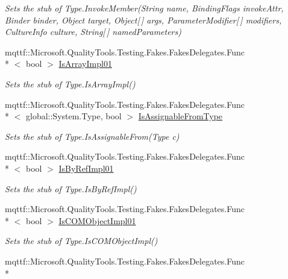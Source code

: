 \begin{DoxyCompactItemize}
\begin{DoxyCompactList}\small\item\em Sets the stub of Type.\-Invoke\-Member(\-String name, Binding\-Flags invoke\-Attr, Binder binder, Object target, Object\mbox{[}$\,$\mbox{]} args, Parameter\-Modifier\mbox{[}$\,$\mbox{]} modifiers, Culture\-Info culture, String\mbox{[}$\,$\mbox{]} named\-Parameters)\end{DoxyCompactList}\item 
mqttf\-::\-Microsoft.\-Quality\-Tools.\-Testing.\-Fakes.\-Fakes\-Delegates.\-Func\\*
$<$ bool $>$ \hyperlink{class_system_1_1_fakes_1_1_stub_type_a0018fb8f6dc2ce66e686666c4e4315d7}{Is\-Array\-Impl01}
\begin{DoxyCompactList}\small\item\em Sets the stub of Type.\-Is\-Array\-Impl()\end{DoxyCompactList}\item 
mqttf\-::\-Microsoft.\-Quality\-Tools.\-Testing.\-Fakes.\-Fakes\-Delegates.\-Func\\*
$<$ global\-::\-System.\-Type, bool $>$ \hyperlink{class_system_1_1_fakes_1_1_stub_type_a2a638755c07b386d7096d6d4c37f063c}{Is\-Assignable\-From\-Type}
\begin{DoxyCompactList}\small\item\em Sets the stub of Type.\-Is\-Assignable\-From(\-Type c)\end{DoxyCompactList}\item 
mqttf\-::\-Microsoft.\-Quality\-Tools.\-Testing.\-Fakes.\-Fakes\-Delegates.\-Func\\*
$<$ bool $>$ \hyperlink{class_system_1_1_fakes_1_1_stub_type_ac060b58752cfb3f9871698ab741f88ff}{Is\-By\-Ref\-Impl01}
\begin{DoxyCompactList}\small\item\em Sets the stub of Type.\-Is\-By\-Ref\-Impl()\end{DoxyCompactList}\item 
mqttf\-::\-Microsoft.\-Quality\-Tools.\-Testing.\-Fakes.\-Fakes\-Delegates.\-Func\\*
$<$ bool $>$ \hyperlink{class_system_1_1_fakes_1_1_stub_type_a41e6ab3b03430bd94b54f7359a6a6cd2}{Is\-C\-O\-M\-Object\-Impl01}
\begin{DoxyCompactList}\small\item\em Sets the stub of Type.\-Is\-C\-O\-M\-Object\-Impl()\end{DoxyCompactList}\item 
mqttf\-::\-Microsoft.\-Quality\-Tools.\-Testing.\-Fakes.\-Fakes\-Delegates.\-Func\\*

\end{DoxyCompactItemize}
